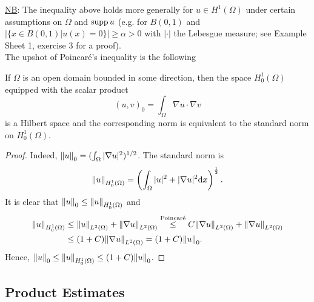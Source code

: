 \documentclass[11pt]{article}
\begin{document}
    		\noindent\underline{NB}: The inequality above holds more generally for $u\in H^1(\Omega)$ under certain assumptions on $\Omega$ and $\operatorname{supp} u$ (e.g. for $B(0,1)$ and $|\{x\in B(0,1)|u(x)=0\}|\ge\alpha>0$ with $|\cdot|$ the Lebesgue measure; see Example Sheet 1, exercise 3 for a proof).  
            \\
            
    		\noindent The upshot of Poincar{\'e}'s inequality is the following
    
    		\begin{cor}
    			If $\Omega$ is an open domain bounded in some direction, then the space $H^1_0(\Omega)$ equipped with the scalar product
    			\begin{equation*}
    				(u,v)_0=\int_\Omega\nabla u\cdot\nabla v
    			\end{equation*}
    			is a Hilbert space and the corresponding norm is equivalent to the standard norm on $H^1_0(\Omega)$.
    		\end{cor}
    		\begin{proof}
    			Indeed, $\norm{u}_0=(\int_\Omega|\nabla u|^2)^{1/2}$. The standard norm is
    			\begin{equation*}
    				\norm{u}_{H^1_0(\Omega)}=\left(\int_\Omega|u|^2+|\nabla u|^2\mathrm{d}x\right)^{\frac{1}{2}}.
    			\end{equation*}
    			It is clear that $\norm{u}_0\le\norm{u}_{H^1_0(\Omega)}$ and
    			\begin{align*}
    				\norm{u}_{H^1_0(\Omega)}&\le\norm{u}_{L^2(\Omega)}+\norm{\nabla u}_{L^2(\Omega)}\overset{\text{Poincar{\'e}}}{\le}C\norm{\nabla u}_{L^2(\Omega)}+\norm{\nabla u}_{L^2(\Omega)}\\&\le(1+C)\norm{\nabla u}_{L^2(\Omega)}
    				=(1+C)\norm{u}_0.
    			\end{align*}
    			Hence, $\norm{u}_0\le\norm{u}_{H^1_0(\Omega)}\le(1+C)\norm{u}_0$.
    		\end{proof}

	
    	\subsection{Product Estimates}
    
\end{document}
